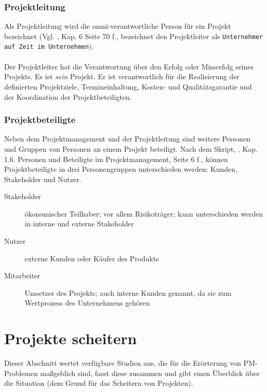 \documentclass[12pt]{scrartcl}
\begin{document}
\subsubsection{Projektleitung}
Als Projektleitung wird die omni-verantwortliche Person für ein Projekt bezeichnet (Vgl. \cite{proj_zum_erfolg_fuehren}, Kap. 6 Seite 70 f., bezeichnet den Projektleiter als \texttt{Unternehmer auf Zeit im Unternehmen}). \\
\\
Der Projektleiter hat die Verantwortung über den Erfolg oder Misserfolg seines Projekts. Es ist \textit{sein} Projekt. Er ist verantwortlich für die Realisierung der definierten Projektziele, Termineinhaltung, Kosten- und Qualitätsgarantie und der Koordination der Projektbeteiligten. 

\subsubsection{Projektbeteiligte}
\label{proj_beteiligte}
Neben dem Projektmanagement und der Projektleitung sind weitere Personen und Gruppen von Personen an einem Projekt beteiligt. Nach dem Skript, \cite{scriptPM}, Kap. 1.6. Personen und Beteiligte im Projektmanagement, Seite 6 f., können Projektbeteiligte in drei Personengruppen unterschieden werden: Kunden, Stakeholder und Nutzer.
\begin{description}
    \item[Stakeholder]
    ökonomischer Teilhaber; vor allem Risikoträger; kann unterschieden werden in interne und externe Stakeholder 
        
    \item[Nutzer]
    externe Kunden oder Käufer des Produkts
    
    \item[Mitarbeiter]
    Umsetzer des Projekts; auch interne Kunden genannt, da sie zum Wertprozess des Unternehmens gehören    
\end{description}

\pagebreak
\section{Projekte scheitern}
\label{projekte_scheitern}
Dieser Abschnitt wertet verfügbare Studien aus, die für die Erörterung von PM-Problemen maßgeblich sind, fasst diese zusammen und gibt einen Überblick über die Situation (dem Grund für das Scheitern von Projekten). 
\end{document}
